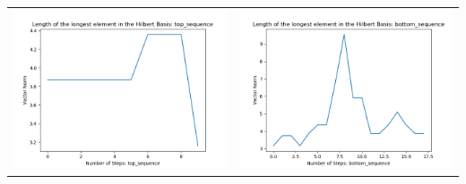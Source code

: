 \documentclass[10pt]{article}
\begin{document}
\begin{tabular}{c|c}
\begin{minipage}{.4\textwidth}
\includegraphics[width=\textwidth]{"DATA/4d/5 generators 2 bound C/top_sequence LENGTH"}
\end{minipage} &
\begin{minipage}{.4\textwidth}
\includegraphics[width=\textwidth]{"DATA/4d/5 generators 2 bound C bottomup/bottom_sequence LENGTH"}
\end{minipage}
\end{tabular}
\end{document}
